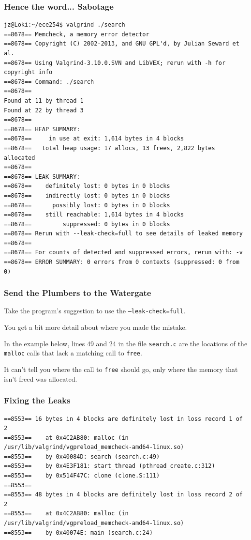 \begin{frame}[fragile]
\frametitle{Hence the word... Sabotage}
{\scriptsize
\begin{verbatim}
jz@Loki:~/ece254$ valgrind ./search 
==8678== Memcheck, a memory error detector
==8678== Copyright (C) 2002-2013, and GNU GPL'd, by Julian Seward et al.
==8678== Using Valgrind-3.10.0.SVN and LibVEX; rerun with -h for copyright info
==8678== Command: ./search
==8678== 
Found at 11 by thread 1 
Found at 22 by thread 3 
==8678== 
==8678== HEAP SUMMARY:
==8678==     in use at exit: 1,614 bytes in 4 blocks
==8678==   total heap usage: 17 allocs, 13 frees, 2,822 bytes allocated
==8678== 
==8678== LEAK SUMMARY:
==8678==    definitely lost: 0 bytes in 0 blocks
==8678==    indirectly lost: 0 bytes in 0 blocks
==8678==      possibly lost: 0 bytes in 0 blocks
==8678==    still reachable: 1,614 bytes in 4 blocks
==8678==         suppressed: 0 bytes in 0 blocks
==8678== Rerun with --leak-check=full to see details of leaked memory
==8678== 
==8678== For counts of detected and suppressed errors, rerun with: -v
==8678== ERROR SUMMARY: 0 errors from 0 contexts (suppressed: 0 from 0)
\end{verbatim}
}

\end{frame}


\begin{frame}
\frametitle{Send the Plumbers to the Watergate}


Take the program's suggestion to use the \texttt{--leak-check=full}.

You get a bit more detail about where you made the mistake. 

In the example below, lines 49 and 24 in the file \texttt{search.c} are the locations of the \texttt{malloc} calls that lack a matching call to \texttt{free}. 

It can't tell you where the call to \texttt{free} should go, only where the memory that isn't freed was allocated.

\end{frame}

\begin{frame}[fragile]
\frametitle{Fixing the Leaks}

{\scriptsize
\begin{verbatim}
==8553== 16 bytes in 4 blocks are definitely lost in loss record 1 of 2
==8553==    at 0x4C2AB80: malloc (in /usr/lib/valgrind/vgpreload_memcheck-amd64-linux.so)
==8553==    by 0x40084D: search (search.c:49)
==8553==    by 0x4E3F181: start_thread (pthread_create.c:312)
==8553==    by 0x514F47C: clone (clone.S:111)
==8553== 
==8553== 48 bytes in 4 blocks are definitely lost in loss record 2 of 2
==8553==    at 0x4C2AB80: malloc (in /usr/lib/valgrind/vgpreload_memcheck-amd64-linux.so)
==8553==    by 0x40074E: main (search.c:24)
\end{verbatim}
}

\end{frame}

